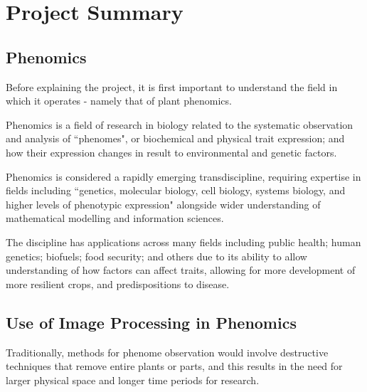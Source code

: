 \documentclass[11pt,fleqn,twoside]{article}
\begin{document}

\mmp

\setcounter{tocdepth}{3} %
\tableofcontents

\newpage

\section{Project Summary}
\subsection{Phenomics}
Before explaining the project, it is first important to understand the field in which it operates - namely that of plant phenomics.

Phenomics is a field of research in biology related to the systematic observation and analysis of ``phenomes", or biochemical and physical trait expression; and how their expression changes in result to environmental and genetic factors.

Phenomics is considered a rapidly emerging transdiscipline, requiring expertise in fields including ``genetics, molecular biology, cell biology, systems biology, and higher levels of phenotypic expression" alongside wider understanding of mathematical modelling and information sciences. \cite{Bilder200930}

The discipline has applications across many fields including public health; human genetics; biofuels; food security; and others due to its ability to allow understanding of how factors can affect traits, allowing for more development of more resilient crops, and predispositions to disease.

\subsection{Use of Image Processing in Phenomics}
Traditionally, methods for phenome observation would involve destructive techniques that remove entire plants or parts, and this results in the need for larger physical space and longer time periods for research. \cite{DeVylder01112012}
\end{document}
